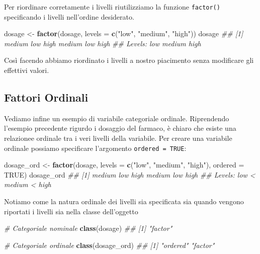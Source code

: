 \documentclass[
]{book}
\newenvironment{Shaded}{\begin{snugshade}}{\end{snugshade}}
\newcommand{\CommentTok}[1]{\textcolor[rgb]{0.56,0.35,0.01}{\textit{#1}}}
\newcommand{\DataTypeTok}[1]{\textcolor[rgb]{0.13,0.29,0.53}{#1}}
\newcommand{\KeywordTok}[1]{\textcolor[rgb]{0.13,0.29,0.53}{\textbf{#1}}}
\newcommand{\NormalTok}[1]{#1}
\newcommand{\OtherTok}[1]{\textcolor[rgb]{0.56,0.35,0.01}{#1}}
\newcommand{\StringTok}[1]{\textcolor[rgb]{0.31,0.60,0.02}{#1}}
\begin{document}
Per riordinare corretamente i livelli riutilizziamo la funzione \texttt{factor()} specificando i livelli nell'ordine desiderato.

\begin{Shaded}
\begin{Highlighting}[]
\NormalTok{dosage <-}\StringTok{ }\KeywordTok{factor}\NormalTok{(dosage, }\DataTypeTok{levels =} \KeywordTok{c}\NormalTok{(}\StringTok{"low"}\NormalTok{, }\StringTok{"medium"}\NormalTok{, }\StringTok{"high"}\NormalTok{))}
\NormalTok{dosage}
\CommentTok{## [1] medium low    high   medium low    high  }
\CommentTok{## Levels: low medium high}
\end{Highlighting}
\end{Shaded}

Così facendo abbiamo riordinato i livelli a nostro piacimento senza modificare gli effettivi valori.

\hypertarget{fattori-ordinali}{%
\subsection{Fattori Ordinali}\label{fattori-ordinali}}

Vediamo infine un esempio di variabile categoriale ordinale. Riprendendo l'esempio precedente rigurdo i dosaggio del farmaco, è chiaro che esiste una relazionee ordinale tra i veri livelli della variabile. Per creare una variabile ordinale possiamo specificare l'argomento \texttt{ordered\ =\ TRUE}:

\begin{Shaded}
\begin{Highlighting}[]
\NormalTok{dosage_ord <-}\StringTok{ }\KeywordTok{factor}\NormalTok{(dosage, }\DataTypeTok{levels =} \KeywordTok{c}\NormalTok{(}\StringTok{"low"}\NormalTok{, }\StringTok{"medium"}\NormalTok{, }\StringTok{"high"}\NormalTok{), }\DataTypeTok{ordered =} \OtherTok{TRUE}\NormalTok{)}
\NormalTok{dosage_ord}
\CommentTok{## [1] medium low    high   medium low    high  }
\CommentTok{## Levels: low < medium < high}
\end{Highlighting}
\end{Shaded}

Notiamo come la natura ordinale dei livelli sia specificata sia quando vengono riportati i livelli sia nella classe dell'oggetto

\begin{Shaded}
\begin{Highlighting}[]
\CommentTok{# Categoriale nominale}
\KeywordTok{class}\NormalTok{(dosage)}
\CommentTok{## [1] "factor"}

\CommentTok{# Categoriale ordinale}
\KeywordTok{class}\NormalTok{(dosage_ord)}
\CommentTok{## [1] "ordered" "factor"}
\end{Highlighting}
\end{Shaded}
\end{document}
